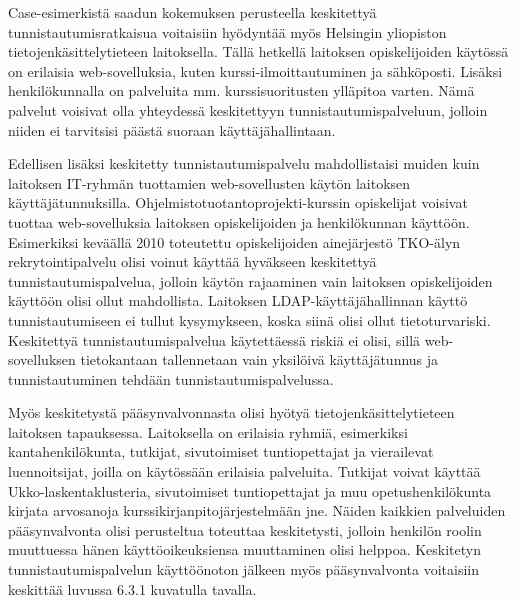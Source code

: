 Case-esimerkistä saadun kokemuksen perusteella keskitettyä tunnistautumisratkaisua voitaisiin hyödyntää myös Helsingin yliopiston tietojenkäsittelytieteen laitoksella. Tällä hetkellä laitoksen opiskelijoiden käytössä on erilaisia web-sovelluksia, kuten kurssi-ilmoittautuminen ja sähköposti. Lisäksi henkilökunnalla on palveluita mm. kurssisuoritusten ylläpitoa varten. Nämä palvelut voisivat olla yhteydessä keskitettyyn tunnistautumispalveluun, jolloin niiden ei tarvitsisi päästä suoraan käyttäjähallintaan.

Edellisen lisäksi keskitetty tunnistautumispalvelu mahdollistaisi muiden kuin laitoksen IT-ryhmän tuottamien web-sovellusten käytön laitoksen käyttäjätunnuksilla. Ohjelmistotuotantoprojekti-kurssin opiskelijat voisivat tuottaa web-sovelluksia laitoksen opiskelijoiden ja henkilökunnan käyttöön. Esimerkiksi keväällä 2010 toteutettu opiskelijoiden ainejärjestö TKO-älyn rekrytointipalvelu olisi voinut käyttää hyväkseen keskitettyä tunnistautumispalvelua, jolloin käytön rajaaminen vain laitoksen opiskelijoiden käyttöön olisi ollut mahdollista. Laitoksen LDAP-käyt\-tä\-jä\-hal\-lin\-nan käyttö tunnistautumiseen ei tullut kysymykseen, koska siinä olisi ollut tietoturvariski. Keskitettyä tunnistautumispalvelua käytettäessä riskiä ei olisi, sillä web-sovelluksen tietokantaan tallennetaan vain yksilöivä käyttäjätunnus ja tunnistautuminen tehdään tunnistautumispalvelussa.

Myös keskitetystä pääsynvalvonnasta olisi hyötyä tietojenkäsittelytieteen laitoksen tapauksessa. Laitoksella on erilaisia ryhmiä, esimerkiksi kantahenkilökunta, tutkijat, sivutoimiset tuntiopettajat ja vierailevat luennoitsijat, joilla on käytössään erilaisia palveluita. Tutkijat voivat käyttää Ukko-laskentaklusteria, sivutoimiset tuntiopettajat ja muu opetushenkilökunta kirjata arvosanoja kurssikirjanpitojärjestelmään jne. Näiden kaikkien palveluiden pääsynvalvonta olisi perusteltua toteuttaa keskitetysti, jolloin henkilön roolin muuttuessa hänen käyttöoikeuksiensa muuttaminen olisi helppoa. Keskitetyn tunnistautumispalvelun käyttöönoton jälkeen myös pääsynvalvonta voitaisiin keskittää luvussa 6.3.1 kuvatulla tavalla.